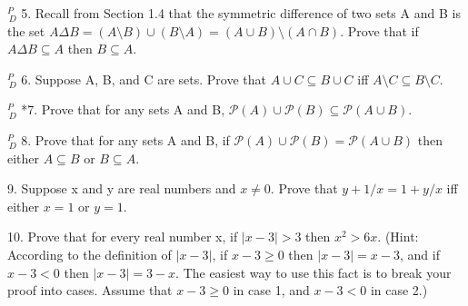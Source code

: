 \documentclass{article}
\begin{document}
\vspace{30pt}



\vspace{30pt}

$^{\textit{P}}_{\, \textit{D}}$ 5. Recall from Section 1.4 that the symmetric difference of two sets A and B
is the set $A \Delta B = (A \setminus B) \cup (B \setminus A) = (A \cup B) \setminus (A \cap B)$. Prove that
if $A \Delta B \subseteq A$ then $B \subseteq A$.

\vspace{30pt}



\vspace{30pt}

$^{\textit{P}}_{\, \textit{D}}$ 6. Suppose A, B, and C are sets. Prove that $A \cup C \subseteq B \cup C$ iff $A \setminus C \subseteq B \setminus C$.

\vspace{30pt}



\vspace{30pt}

$^{\textit{P}}_{\, \textit{D}}$ *7. Prove that for any sets A and B, $\mathcal{P} (A) \cup \mathcal{P} (B) \subseteq \mathcal{P} (A \cup B)$.

\vspace{30pt}



\vspace{30pt}

$^{\textit{P}}_{\, \textit{D}}$ 8. Prove that for any sets A and B, if $\mathcal{P} (A) \cup \mathcal{P} (B) = \mathcal{P} (A \cup B)$ then either $A \subseteq B$ or $B \subseteq A$.

\vspace{30pt}



\vspace{30pt}

9. Suppose x and y are real numbers and $x \neq 0$. Prove that $y + 1/x =
1 + y/x$ iff either $x = 1$ or $y = 1$.

\vspace{30pt}



\vspace{30pt}

10. Prove that for every real number x, if $|x - 3| > 3$ then $x^2 > 6x$. (Hint:
According to the definition of $|x - 3|$, if $x - 3 \geq 0$ then $|x - 3| = x - 3$, and if $x - 3 < 0$ then $|x - 3| = 3 - x$. The easiest way to use this fact is to break your proof into cases. Assume that $x - 3 \geq 0$ in case 1, and $x - 3 < 0$ in case 2.)
\end{document}
